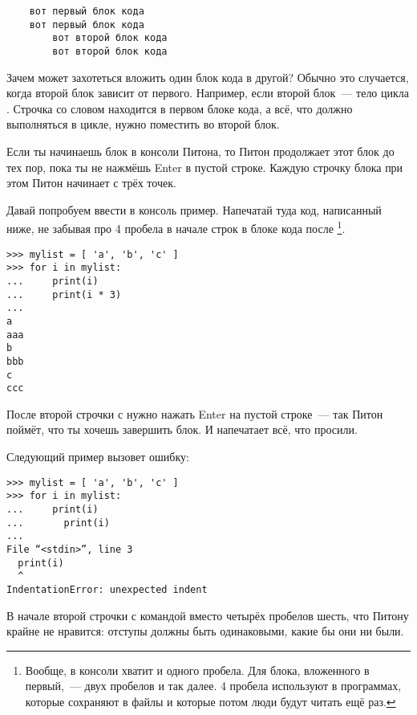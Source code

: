 \begin{listing}
\begin{verbatim}
    вот первый блок кода
    вот первый блок кода
        вот второй блок кода
        вот второй блок кода
\end{verbatim}
\end{listing}

Зачем может захотеться вложить один блок кода в другой? Обычно это случается, когда второй блок зависит от первого. Например, если второй блок — тело цикла . Строчка со словом  находится в первом блоке кода, а всё, что должно выполняться в цикле, нужно поместить во второй блок.

Если ты начинаешь блок в консоли Питона, то Питон продолжает этот блок до тех пор, пока ты не нажмёшь
Enter в пустой строке. Каждую строчку блока при этом Питон начинает с трёх точек.

Давай попробуем ввести в консоль пример. Напечатай туда код, написанный ниже, не забывая про 4 пробела в начале строк в блоке кода после \footnote{Вообще, в консоли хватит и одного пробела. Для блока, вложенного в первый, — двух пробелов и так далее. 4 пробела используют в программах, которые сохраняют в файлы и которые потом люди будут читать ещё раз.}.

\begin{listing}
\begin{verbatim}
>>> mylist = [ 'a', 'b', 'c' ]
>>> for i in mylist:
...     print(i)
...     print(i * 3)
...
a
aaa
b
bbb
c
ccc
\end{verbatim}
\end{listing}

После второй строчки с  нужно нажать Enter на пустой строке — так Питон поймёт, что ты хочешь завершить блок. И напечатает всё, что просили.

Следующий пример вызовет ошибку:

\begin{listing}
\begin{verbatim}
>>> mylist = [ 'a', 'b', 'c' ]
>>> for i in mylist:
...     print(i)
...       print(i)
...
File “<stdin>”, line 3
  print(i)
  ^
IndentationError: unexpected indent
\end{verbatim}
\end{listing}

В начале второй строчки с командой  вместо четырёх пробелов шесть, что Питону крайне не нравится: отступы должны быть одинаковыми, какие бы они ни были.

